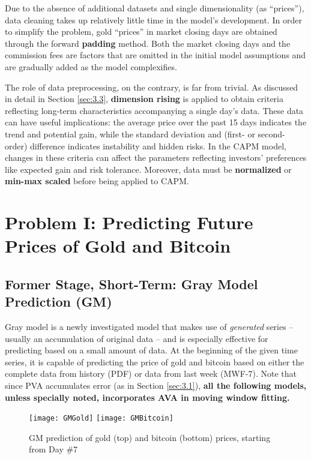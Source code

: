 \documentclass{mcmthesis}
\begin{document}
	Due to the absence of additional datasets and single dimensionality (as ``prices''), data cleaning takes up relatively little time in the model's development. In order to simplify the problem, gold ``prices'' in market closing days are obtained through the forward \textbf{padding} method. Both the market closing days and the commission fees are factors that are omitted in the initial model assumptions and are gradually added as the model complexifies. 
	
	The role of data preprocessing, on the contrary, is far from trivial. As discussed in detail in Section \ref{sec:3.3}, \textbf{dimension rising} is applied to obtain criteria reflecting long-term characteristics accompanying a single day's data. These data can have useful implications: the average price over the past 15 days indicates the trend and potential gain, while the standard deviation and (first- or second-order) difference indicates instability and hidden risks. In the CAPM model, changes in these criteria can affect the parameters reflecting investors' preferences like expected gain and risk tolerance. Moreover, data must be \textbf{normalized} or \textbf{min-max scaled} before being applied to CAPM. 
		
	\newpage
	\section{Problem I: Predicting Future Prices of Gold and Bitcoin}
	
	\subsection{Former Stage, Short-Term: Gray Model Prediction (GM)}
	
	Gray model is a newly investigated model that makes use of \textit{generated} series -- usually an accumulation of original data -- and is especially effective for predicting based on a small amount of data. At the beginning of the given time series, it is capable of predicting the price of gold and bitcoin based on either the complete data from history (PDF) or data from last week (MWF-7). Note that since PVA accumulates error (as in Section \ref{sec:3.1}), \textbf{all the following models, unless specially noted, incorporates AVA in moving window fitting.}
	
	\begin{figure}[h]
		\label {fig:3}
		\centering \texttt{[image: GMGold]}
		\centering \texttt{[image: GMBitcoin]}
		\caption{GM prediction of gold (top) and bitcoin (bottom) prices, starting from Day \#7}
	\end{figure}
	
\end{document}
